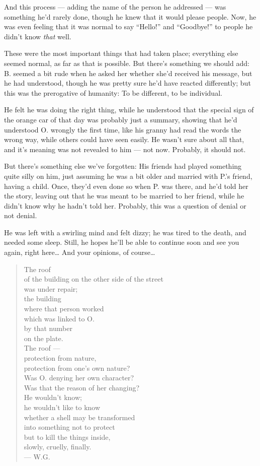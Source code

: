 And this process --- adding the name of the person he addressed --- was something he'd rarely done, though he knew that it would please people. Now, he was even feeling that it was normal to say \enquote{Hello!} and \enquote{Goodbye!} to people he didn't know \emph{that} well.

These were the most important things that had taken place; everything else seemed normal, as far as that is possible. But there's something we should add: B. seemed a bit rude when he asked her whether she'd received his message, but he had understood, though he was pretty sure he'd have reacted differently; but this was the prerogative of humanity: To be different, to be individual.

He felt he was doing the right thing, while he understood that the special sign of the orange car of that day was probably just a summary, showing that he'd understood O. wrongly the first time, like his granny had read the words the wrong way, while others could have seen easily. He wasn't sure about all that, and it's meaning was not revealed to him --- not now. Probably, it should not.

But there's something else we've forgotten: His friends had played something quite silly on him, just assuming he was a bit older and married with P.'s friend, having a child. Once, they'd even done so when P. was there, and he'd told her the story, leaving out that he was meant to be married to her friend, while he didn't know why he hadn't told her. Probably, this was a question of denial or not denial.

He was left with a swirling mind and felt dizzy; he was tired to the death, and needed some sleep. 
Still, he hopes he'll be able to continue soon and see you again, right here\ldots
And your opinions, of course\ldots

\begin{quote}
The roof \\
of the building on the other side of the street \\
was under repair; \\
the building \\
where that person worked \\
which was linked to O. \\
by that number \\
on the plate. \\
The roof --- \\
protection from nature, \\
protection from one's own nature? \\
Was O. denying her own character? \\
Was that the reason of her changing? \\
He wouldn't know; \\
he wouldn't like to know \\
whether a shell may be transformed \\
into something not to protect \\
but to kill the things inside, \\
slowly, cruelly, finally. \\
--- W.G.
\end{quote}

